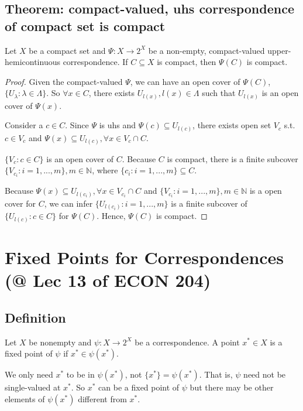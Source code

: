 \documentclass[11pt]{elegantbook}
\begin{document}
\subsection{Theorem: compact-valued, uhs correspondence of compact set is compact}
\begin{theorem}\label{thm:compact-valued, uhs correspondence of compact set is compact}
    Let $X$ be a compact set and $\Psi : X \rightarrow 2^X$ be a non-empty, compact-valued upper-hemicontinuous correspondence. If $C \subseteq X$ is compact, then $\Psi(C)$ is compact.
\end{theorem}
\begin{proof}
    Given the compact-valued $\Psi$, we can have an open cover of $\Psi(C)$, $\{U_\lambda:\lambda\in\Lambda\}$. So $\forall x\in C$, there exists $U_{l(x)},l(x)\in\Lambda$ such that $U_{l(x)}$ is an open cover of $\Psi(x)$.

    Consider a $c\in C$. Since $\Psi$ is uhs and $\Psi(c)\subseteq U_{l(c)}$, there exists open set $V_c$ s.t. $c\in V_c$ and $\Psi(x)\subseteq U_{l(c)}, \forall x\in V_c\cap C$.

    $\{V_c:c\in C\}$ is an open cover of $C$. Because $C$ is compact, there is a finite subcover $\{V_{c_i}: i=1,...,m\},m\in \mathbb{N}$, where $\{c_i:i=1,...,m\}\subseteq C$.

    Because $\Psi(x)\subseteq U_{l(c_i)}, \forall x\in V_{c_i}\cap C$ and $\{V_{c_i}: i=1,...,m\},m\in \mathbb{N}$ is a open cover for $C$, we can infer $\{U_{l(c_i)}:i=1,...,m\}$ is a finite subcover of $\{U_{l(c)}:c\in C\}$ for $\Psi(C)$. Hence, $\Psi(C)$ is compact.
\end{proof}

\section{Fixed Points for Correspondences \small{(@ Lec 13 of ECON 204)}}
\subsection{Definition}
\begin{definition}
    \normalfont
    Let $X$ be nonempty and $\psi : X \rightarrow 2^X$ be a correspondence. A point $x^* \in X$ is a fixed point of $\psi$ if $x^* \in \psi(x^*)$.
\end{definition}
\begin{note}
    We only need $x^*$ to be in $\psi(x^*)$, not $\{x^*\} = \psi(x^*)$. That is, $\psi$ need not be single-valued at $x^*$. So $x^*$ can be a fixed point of $\psi$ but there may be other elements of $\psi(x^*)$ different from $x^*$.
\end{note}
\end{document}
